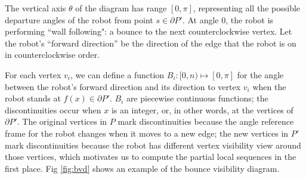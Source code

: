 \documentclass[]{styles/svproc}  %
\begin{document}
The vertical axis $\theta$ of the diagram has range $[0, \pi]$, representing all
the possible departure angles of the robot from point $s \in \partial P'$. 
At angle $0$, the robot is performing ``wall following": a bounce
to the next counterclockwise vertex.
Let the robot's ``forward direction'' be the direction of the edge that the
robot is on in counterclockwise order.

For each vertex $v_i$, we can define a function $B_i: [0, n) \mapsto [0, \pi]$
for the angle between the robot's forward direction and its direction to vertex
$v_i$ when the robot stands at $f(x)\in \partial P'$. $B_i$ are piecewise
continuous functions; the discontinuities occur when $x$ is an integer, or, in
other words, at the vertices of $\partial P'$. The original vertices in $P$ mark
discontinuities because the angle reference frame for the robot changes when it
moves to a new edge; the new vertices in $P'$ mark discontinuities because the
robot has different vertex visibility view around those vertices, which
motivates us to compute the partial local sequences in the first place.
Fig \ref{fig:bvd} shows an example of the bounce visibility diagram.
\end{document}
